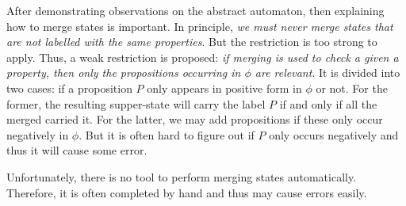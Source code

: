 \documentclass{acmtog} %
\begin{document}
        After demonstrating observations on the abstract automaton, then explaining how to merge states is important. In principle, \textit{we must never merge states that are not labelled with the same properties}. But the restriction is too strong to apply. Thus, a weak restriction is proposed: \textit{if merging is used to check a given a property, then only the propositions occurring in $\phi$ are relevant}. It is divided into two cases: if a proposition $P$ only appears in positive form in $\phi$ or not. For the former, the resulting supper-state will carry the label $P$ if and only if all the merged carried it. For the latter, we may add propositions if these only occur negatively in $\phi$. But it is often hard to figure out if $P$ only occurs negatively and thus it will cause some error.

        Unfortunately, there is no tool to perform merging states automatically. Therefore, it is often completed by hand and thus may cause errors easily.
\end{document}
